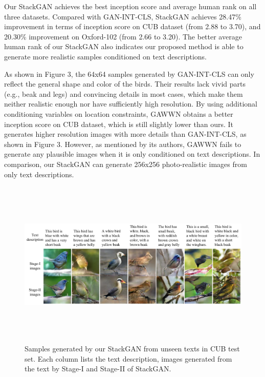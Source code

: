 \documentclass[a4paper,12pt,oneside]{article}
\begin{document}
Our StackGAN achieves the best inception score and average human rank on all three datasets. Compared with GAN-INT-CLS, StackGAN achieves 28.47\% improvement in terms of inception score on CUB dataset (from 2.88 to 3.70), and 20.30\% improvement on Oxford-102 (from 2.66 to 3.20). The better average human rank of our StackGAN also indicates our proposed method is able to generate more realistic samples conditioned on text descriptions. 

As shown in Figure 3, the 64x64 samples generated by GAN-INT-CLS can only reflect the general shape and color of the birds.
Their results lack vivid parts (e.g., beak and legs) and convincing details in most cases, which make them neither realistic enough nor have sufficiently 
high resolution. By using additional conditioning variables on location constraints, GAWWN obtains a better inception score on CUB dataset, which is still slightly lower 
than ours. It generates higher resolution images with more details than GAN-INT-CLS, as shown in Figure 3. However, as mentioned by its authors, GAWWN fails to generate any plausible images when it is only conditioned 
on text descriptions. In comparison, our StackGAN can generate 256x256 photo-realistic images from only text descriptions. 

\begin{figure}[H]
\centering
\includegraphics[height=8cm,width=15cm]{Figure5.png}
\caption[Samples generated by our StackGAN from unseen texts in CUB test set]{Samples generated by our StackGAN from unseen texts in CUB test set. Each column lists the text description, images generated from the text by Stage-I and Stage-II of StackGAN.}
\end{figure}
\end{document}

